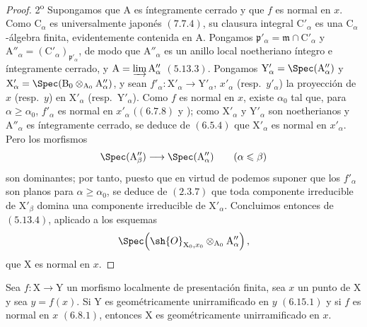 \begin{proof}
2\textsuperscript{o} Supongamos que $\mathrm{A}$ es íntegramente cerrado y que $f$ es normal en $x$. Como $\mathrm{C}_\alpha$ es universalmente japonés $(7.7.4)$, su clausura integral $\mathrm{C}'_\alpha$ es una $\mathrm{C}_\alpha$-álgebra finita, evidentemente contenida en $\mathrm{A}$. Pongamos $\mathfrak{p}'_\alpha=\mathfrak{m}\cap\mathrm{C}'_\alpha$ y $\mathrm{A}''_\alpha=(\mathrm{C}'_\alpha)_{\mathfrak{p}'_\alpha}$, de modo que $\mathrm{A}''_\alpha$ es un anillo local noetheriano íntegro e íntegramente cerrado, y $\mathrm{A}=\varinjlim\mathrm{A}''_\alpha$ $(5.13.3)$. Pongamos $\mathrm{Y}'_\alpha=\Spec(\mathrm{A}''_\alpha)$ y $\mathrm{X}'_\alpha=\Spec(\mathrm{B}_0\otimes_{\mathrm{A}_0}\mathrm{A}''_\alpha)$, y sean $f'_\alpha:\mathrm{X}'_\alpha\to\mathrm{Y}'_\alpha$, $x'_\alpha$ (resp.\ $y'_\alpha$) la proyección de $x$ (resp.\ $y$) en $\mathrm{X}'_\alpha$ (resp.\ $\mathrm{Y}'_\alpha$). Como $f$ es normal en $x$, existe $\alpha_0$ tal que, para $\alpha\geqslant\alpha_0$, $f'_\alpha$ es normal en $x'_\alpha$ $((6.7.8)$ y );  como $\mathrm{X}'_\alpha$ y $\mathrm{Y}'_\alpha$ son noetherianos y $\mathrm{A}''_\alpha$ es íntegramente cerrado, se deduce de $(6.5.4)$ que $\mathrm{X}'_\alpha$ es normal en $x'_\alpha$. Pero los morfismos
\[
  \Spec(\mathrm{A}''_\beta)\longrightarrow\Spec(\mathrm{A}''_\alpha)
  \qquad(\alpha\leqslant\beta)
\]
son dominantes; por tanto, puesto que en virtud de  podemos suponer que los $f'_\alpha$ son planos para $\alpha\geqslant\alpha_0$, se deduce de $(2.3.7)$ que toda componente irreducible de $\mathrm{X}'_\beta$ domina una componente irreducible de $\mathrm{X}'_\alpha$. Concluimos entonces de $(5.13.4)$, aplicado a los esquemas
\[
  \Spec\!\left(\sh{O}_{\mathrm{X}_0,x_0}\otimes_{\mathrm{A}_0}\mathrm{A}''_\alpha\right),
\]
que $\mathrm{X}$ es normal en $x$.
\end{proof}

\begin{corollary}[11.3.14]
\label{IV.11.3.14}
Sea $f:\mathrm{X}\to\mathrm{Y}$ un morfismo localmente de presentación finita, sea $x$ un punto de $\mathrm{X}$ y sea $y=f(x)$. Si $\mathrm{Y}$ es geométricamente unirramificado en $y$ $(6.15.1)$ y si $f$ es normal en $x$ $(6.8.1)$, entonces $\mathrm{X}$ es geométricamente unirramificado en $x$.
\end{corollary}


